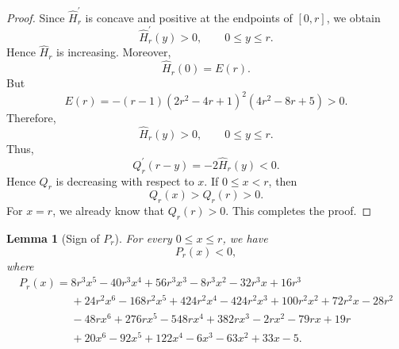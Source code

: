 \documentclass[11pt,a4paper]{article}
\numberwithin{equation}{section}
\numberwithin{table}{section}
\theoremstyle{plain}
\newtheorem{lemma}[theorem]{Lemma}
\theoremstyle{definition}\newtheorem{definition}[theorem]{Definition}
\theoremstyle{remark}\newtheorem{remark}[theorem]{Remark}
\begin{document}
\begin{proof}
Since $\widehat H_r^{\prime}$ is concave and positive at the endpoints
of $[0,r]$, we obtain 
\begin{equation*}
\widehat H_r^{\prime}(y)>0, \qquad 0\leq y\leq r.
\end{equation*}
Hence $\widehat H_r$ is increasing. Moreover, 
\begin{equation*}
\widehat H_r(0)=E(r).
\end{equation*}
But 
\begin{equation*}
E(r)=-(r-1)(2r^2-4r+1)^2(4r^2-8r+5)>0.
\end{equation*}
Therefore, 
\begin{equation*}
\widehat H_r(y)>0, \qquad 0\leq y\leq r.
\end{equation*}
Thus, 
\begin{equation*}
Q_r^{\prime}(r-y)=-2\widehat H_r(y)<0.
\end{equation*}
Hence $Q_r$ is decreasing with respect to $x$. If $0\leq x<r$, then 
\begin{equation*}
Q_r(x)>Q_r(r)>0.
\end{equation*}
For $x=r$, we already know that $Q_r(r)>0$. This completes the proof.
\end{proof}

\begin{lemma}[Sign of $P_{r}$]\label{supp:s2lemma9}
For every $0\leq x\leq r$, we have 
\begin{equation*}
P_{r}(x)<0,
\end{equation*}%
where 
\begin{equation*}
\begin{array}{l}
P_{r}(x)=8r^{3}x^{5}-40r^{3}x^{4}+56r^{3}x^{3}-8r^{3}x^{2}-32r^{3}x+16r^{3}
\\ 
\phantom{P_r(x)=}{}%
+24r^{2}x^{6}-168r^{2}x^{5}+424r^{2}x^{4}-424r^{2}x^{3}+100r^{2}x^{2}+72r^{2}x-28r^{2}
\\ 
\phantom{P_r(x)=}{}-48rx^{6}+276rx^{5}-548rx^{4}+382rx^{3}-2rx^{2}-79rx+19r
\\ 
\phantom{P_r(x)=}{}+20x^{6}-92x^{5}+122x^{4}-6x^{3}-63x^{2}+33x-5.%
\end{array}%
\end{equation*}
\end{lemma}
\end{document}
